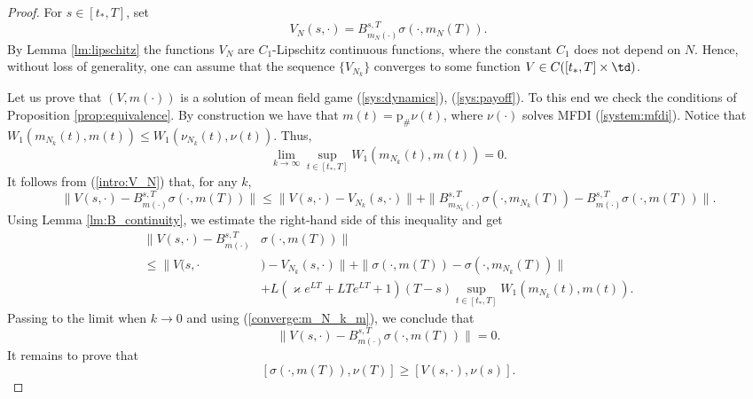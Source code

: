 \documentclass[a4paper,12pt]{article}
\begin{document}
\begin{proof}
	For $s\in [t_*,T]$, set 
	\begin{equation}\label{intro:V_N}
	V_N(s,\cdot)=B^{s,T}_{m_N(\cdot)}\sigma(\cdot,m_N(T)).
	\end{equation}
	By Lemma \ref{lm:lipschitz} the functions $ V_N$  are $C_1$-Lipschitz continuous functions, where the constant $C_1$ does not depend on $N$. Hence, without loss of generality, one can assume that the sequence $\{V_{N_k}\}$ converges to some function $V\in C([t_*,T]\times\td)$. 
	
	Let us prove that $(V,m(\cdot))$ is a solution of mean field game (\ref{sys:dynamics}), (\ref{sys:payoff}). To this end we check the conditions of Proposition \ref{prop:equivalence}. 
	By construction we have that $m(t)=\mathrm{p}_\#\nu(t)$, where $\nu(\cdot)$ solves MFDI (\ref{system:mfdi}).
	Notice that $W_1(m_{N_k}(t),m(t))\leq W_1(\nu_{N_k}(t),\nu(t))$. Thus,
	\begin{equation}\label{converge:m_N_k_m}
	\lim_{k\rightarrow\infty}\sup_{t\in [t_*,T]}W_1(m_{N_k}(t),m(t))=0.
	\end{equation} It follows from (\ref{intro:V_N}) that, for any $k$,
	\begin{equation*}%
	\|V(s,\cdot)-B_{m(\cdot)}^{s,T}\sigma(\cdot,m(T))\|
	\leq
	\|V(s,\cdot)-V_{N_k}(s,\cdot)\|  +\|B_{m_{N_k}(\cdot)}^{s,T}\sigma(\cdot,m_{N_k}(T))-B_{m(\cdot)}^{s,T}\sigma(\cdot,m(T))\|.
	\end{equation*}
	Using Lemma \ref{lm:B_continuity}, we estimate the right-hand side of this inequality and get
	\begin{equation*}\begin{split}\|V(s,\cdot)-B_{m(\cdot)}^{s,T}&\sigma(\cdot,m(T))\|\\ \leq \|V(s,\cdot&)-V_{N_k}(s,\cdot)\|+ \|\sigma(\cdot,m(T))-\sigma(\cdot,m_{N_k}(T))\|\\
	&+L(\varkappa e^{LT}+LTe^{LT}+1)(T-s)\sup_{t\in [t_*,T]}W_1(m_{N_k}(t),m(t)).
	\end{split}
	\end{equation*}
	Passing to the limit when $k\rightarrow 0$ and using (\ref{converge:m_N_k_m}), we conclude that
	\begin{equation}\label{equal:V_B}
	\|V(s,\cdot)-B_{m(\cdot)}^{s,T}\sigma(\cdot,m(T))\|=0.
	\end{equation} 
	It remains to prove that 
	\begin{equation}\label{ineq:action_V_nu}
	[\sigma(\cdot,m(T)),\nu(T)]\geq [V(s,\cdot),\nu(s)].

\end{equation}
\end{proof}
\end{document}
